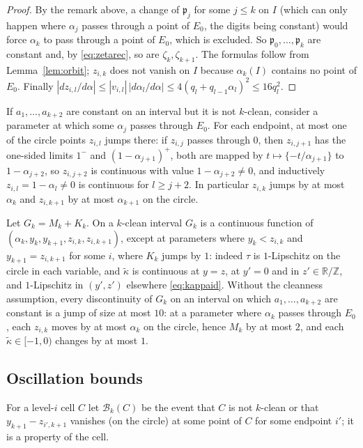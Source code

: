\documentclass[11pt]{amsart}
\theoremstyle{definition}
\numberwithin{equation}{section}
\newcommand{\R}{\mathbb{R}}
\newcommand{\Z}{\mathbb{Z}}
\newcommand{\cB}{\mathcal{B}}
\newcommand{\fp}{\mathfrak{p}}
\newcommand{\fr}[1]{\{#1\}}
\begin{document}
\begin{proof}
By the remark above, a change of $\fp_j$ for some $j\le k$ on $I$ (which can only happen where $\alpha_j$ passes through a point of $E_0$, the digits
being constant) would force $\alpha_k$ to pass through a point of $E_0$, which is excluded. So $\fp_0,\dots,\fp_k$ are constant and, by \eqref{eq:zetarec},
so are $\zeta_k,\zeta_{k+1}$. The formulas follow from Lemma~\ref{lem:orbit}; $z_{i,k}$ does not vanish on $I$ because $\alpha_k(I)$ contains no point of $E_0$.
Finally $|dz_{i,l}/d\alpha|\le|v_{i,l}|\,|d\alpha_l/d\alpha|\le4(q_l+q_{l-1}\alpha_l)^2\le16q_l^2$.
\end{proof}

If $a_1,\dots,a_{k+2}$ are constant on an interval but it is not $k$-clean, consider a parameter at which some $\alpha_j$ passes through $E_0$. For each
endpoint, at most one of the circle points $z_{i,l}$ jumps there: if $z_{i,j}$ passes through $0$, then $z_{i,j+1}$ has the one-sided limits $1^-$ and
$(1-\alpha_{j+1})^+$, both are mapped by $t\mapsto\fr{-t/\alpha_{j+1}}$ to $1-\alpha_{j+2}$, so $z_{i,j+2}$ is continuous with value $1-\alpha_{j+2}\ne0$, and
inductively $z_{i,l}=1-\alpha_l\ne0$ is continuous for $l\ge j+2$. In particular $z_{i,k}$ jumps by at most $\alpha_k$ and $z_{i,k+1}$ by at most $\alpha_{k+1}$ on
the circle.

Let $G_k=M_k+K_k$. On a $k$-clean interval $G_k$ is a continuous function of $(\alpha_k,y_k,y_{k+1},z_{i,k},z_{i,k+1})$, except at parameters where
$y_k<z_{i,k}$ and $y_{k+1}=z_{i,k+1}$ for some $i$, where $K_k$ jumps by $1$: indeed $\tau$ is $1$-Lipschitz on the circle in each variable, and
$\tilde\kappa$ is continuous at $y=z$, at $y'=0$ and in $z'\in\R/\Z$, and $1$-Lipschitz in $(y',z')$ elsewhere \eqref{eq:kappaid}. Without the
cleanness assumption, every discontinuity of $G_k$ on an interval on which $a_1,\dots,a_{k+2}$ are constant is a jump of size at most $10$: at a parameter
where $\alpha_k$ passes through $E_0$, each $z_{i,k}$ moves by at most $\alpha_k$ on the circle, hence $M_k$ by at most $2$, and each $\tilde\kappa\in[-1,0)$
changes by at most $1$.

\subsection{Oscillation bounds}
For a level-$i$ cell $C$ let $\cB_k(C)$ be the event that $C$ is not $k$-clean or that $y_{k+1}-z_{i',k+1}$ vanishes (on the circle) at some point of $C$ for
some endpoint $i'$; it is a property of the cell.
\end{document}
